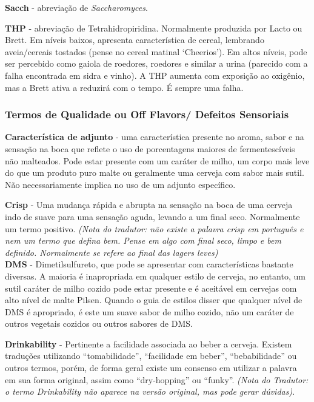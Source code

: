 \textbf{Sacch} - abreviação de \textit{Saccharomyces}.

\textbf{THP} - abreviação de Tetrahidropiridina. Normalmente produzida por Lacto ou Brett. Em níveis baixos, apresenta característica de cereal, lembrando aveia/cereais tostados (pense no cereal matinal ‘Cheerios’). Em altos níveis, pode ser percebido como gaiola de roedores, roedores e similar a urina (parecido com a falha encontrada em sidra e vinho). A THP aumenta com exposição ao oxigênio, mas a Brett ativa a reduzirá com o tempo. É sempre uma falha.

\subsubsection*{Termos de Qualidade ou Off Flavors/ Defeitos Sensoriais}
\textbf{Característica de adjunto} - uma característica presente no aroma, sabor e na sensação na boca que reflete o uso de porcentagens maiores de fermentescíveis não malteados. Pode estar presente com um caráter de milho, um corpo mais leve do que um produto puro malte ou geralmente uma cerveja com sabor mais sutil. Não necessariamente implica no uso de um adjunto específico.

\textbf{Crisp} - Uma mudança rápida e abrupta na sensação na boca de uma cerveja indo de suave para uma sensação aguda, levando a um final seco. Normalmente um termo positivo.
\textit{(Nota do tradutor: não existe a palavra crisp em português e nem um termo que defina bem. Pense em algo com final seco, limpo e bem definido. Normalmente se refere ao final das lagers leves)}\\

\textbf{DMS} - Dimetilsulfureto, que pode se apresentar com características bastante diversas. A maioria é inapropriada em qualquer estilo de cerveja, no entanto, um sutil caráter de milho cozido pode estar presente e é aceitável em cervejas com alto nível de malte Pilsen. Quando o guia de estilos disser que qualquer nível de DMS é apropriado, é este um suave sabor de milho cozido, não um caráter de outros vegetais cozidos ou outros sabores de DMS.

\textbf{Drinkability} - Pertinente a facilidade associada ao beber a cerveja. Existem traduções utilizando “tomabilidade”, “facilidade em beber”, “bebabilidade” ou outros termos, porém, de forma geral existe um consenso em utilizar a palavra em sua forma original, assim como “dry-hopping” ou “funky”. \textit{(Nota do Tradutor: o termo Drinkability não aparece na versão original, mas pode gerar dúvidas)}.

